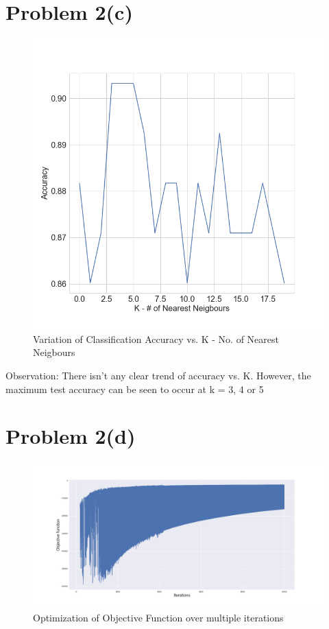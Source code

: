 \documentclass[openany,11pt]{homework}
\begin{document}
\section*{Problem 2(c)}
\begin{figure}[h]
	\centering
	\includegraphics[width=\textwidth]{2c}
	\caption{Variation of Classification Accuracy vs. K - No. of Nearest Neigbours}
\end{figure}

Observation: There isn't any clear trend of accuracy vs. K. However, the maximum test accuracy can be seen to occur at k = 3, 4 or 5

\section*{Problem 2(d)}
\begin{figure}[h]
	\centering
	\includegraphics[width=\textwidth]{2d}
	\caption{Optimization of Objective Function over multiple iterations}
\end{figure}
\end{document}
